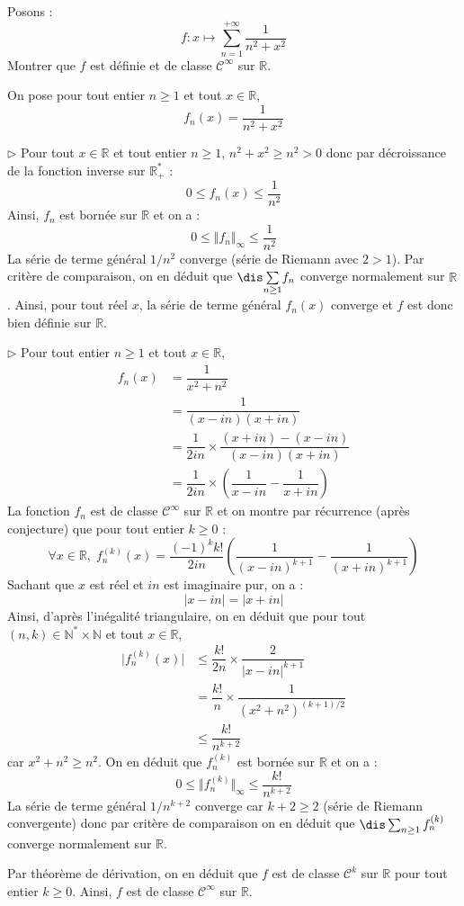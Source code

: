 \documentclass[a4paper,10pt]{report}
\newcommand{\Sum}[2]{\ensuremath{\textstyle{\sum\limits_{#1}^{#2}}}}
\begin{document}
\medskip



 

\begin{Exercice}{} Posons :
$$f: x \mapsto \sum_{n=1}^{+ \infty} \dfrac{1}{n^2+x^2}$$
Montrer que $f$ est définie et de classe $\mathcal{C}^{\infty}$ sur $\mathbb{R}$.
\end{Exercice} 

\corr On pose pour tout entier $n \geq 1$ et tout $x \in \mathbb{R}$,
$$ f_n(x) = \dfrac{1}{n^2+x^2}$$

\medskip

\noindent $\rhd$ Pour tout $x \in \mathbb{R}$ et tout entier $n \geq 1$, $n^2+x^2 \geq n^2>0$ donc par décroissance de la fonction inverse sur $\mathbb{R}_+^*$ :
$$ 0 \leq f_n(x) \leq \dfrac{1}{n^2}$$
Ainsi, $f_n$ est bornée sur $\mathbb{R}$ et on a :
$$ 0 \leq \Vert f_n \Vert_{\infty} \leq \dfrac{1}{n^2}$$
La série de terme général $1/n^2$ converge (série de Riemann avec $2>1$). Par critère de comparaison, on en déduit que $\dis \Sum{n \geq1}{} f_n$ converge normalement sur $\mathbb{R}$. Ainsi, pour tout réel $x$, la série de terme général $f_n(x)$ converge et $f$ est donc bien définie sur $\mathbb{R}$.

\medskip

\noindent $\rhd$ Pour tout entier $n \geq 1$ et tout $x \in \mathbb{R}$,
\begin{align*}
f_n(x) & = \dfrac{1}{x^2+n^2} \\
& = \dfrac{1}{(x-in)(x+in)} \\
& = \dfrac{1}{2in} \times \dfrac{(x+in)-(x-in)}{(x-in)(x+in)} \\
& = \dfrac{1}{2in} \times \left( \dfrac{1}{x-in} - \dfrac{1}{x+in} \right)
\end{align*}
La fonction $f_n$ est de classe $\mathcal{C}^{\infty}$ sur $\mathbb{R}$ et on montre par récurrence (après conjecture) que pour tout entier $k \geq 0$ :
$$ \forall x \in \mathbb{R}, \; f_n^{(k)}(x) = \dfrac{(-1)^k k!}{2in} \left( \dfrac{1}{(x-in)^{k+1}} - \dfrac{1}{(x+in)^{k+1}} \right) $$
Sachant que $x$ est réel et $in$ est imaginaire pur, on a :
$$ \vert x-in \vert = \vert x+in \vert$$
Ainsi, d'après l'inégalité triangulaire, on en déduit que pour tout $(n,k) \in \mathbb{N}^* \times \mathbb{N}$ et tout $x \in \mathbb{R}$,
\begin{align*}
\vert  f_n^{(k)}(x) \vert & \leq \dfrac{k!}{2n} \times \dfrac{2}{\vert x-in \vert^{k+1}} \\
& = \dfrac{k!}{n} \times \dfrac{1}{(x^2+n^2)^{(k+1)/2}} \\
& \leq \dfrac{k!}{n^{k+2}}  
\end{align*}
car $x^2+n^2 \geq n^2$. On en déduit que $f_n^{(k)}$ est bornée sur $\mathbb{R}$ et on a :
$$ 0 \leq \Vert f_n^{(k)} \Vert_{\infty} \leq \dfrac{k!}{n^{k+2}} $$
La série de terme général $1/n^{k+2}$ converge car $k+2 \geq 2$ (série de Riemann convergente) donc par critère de comparaison on en déduit que $\dis \sum_{n \geq 1} f_n^{(k)}$ converge normalement sur $\mathbb{R}$.

\medskip

\noindent Par théorème de dérivation, on en déduit que $f$ est de classe $\mathcal{C}^k$ sur $\mathbb{R}$ pour tout entier $k \geq 0$. Ainsi, $f$ est de classe $\mathcal{C}^{\infty}$ sur $\mathbb{R}$.
\end{document}
